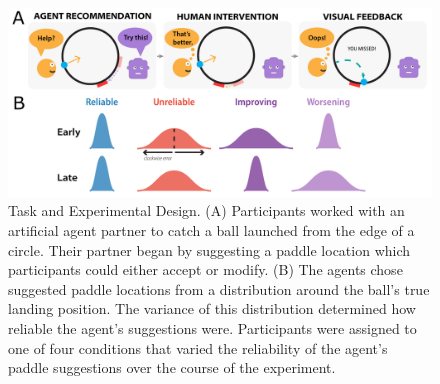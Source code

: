 \documentclass[10pt,letterpaper]{article}
\begin{document}
\begin{figure}[hbtp]
\vspace{-8mm}
\includegraphics[width=\textwidth]{img/expt_overview_v3_new.pdf} 
\vspace{-4mm}
\caption{Task and Experimental Design. (A) Participants worked with an artificial agent partner to catch a ball launched from the edge of a circle. Their partner began by suggesting a paddle location which participants could either accept or modify. (B) The agents chose suggested paddle locations from a distribution around the ball's true landing position. The variance of this distribution determined how reliable the agent's suggestions were. Participants were assigned to one of four conditions that varied the reliability of the agent's paddle suggestions over the course of the experiment.} 
\label{fig:stimuli}
\end{figure}
\end{document}
